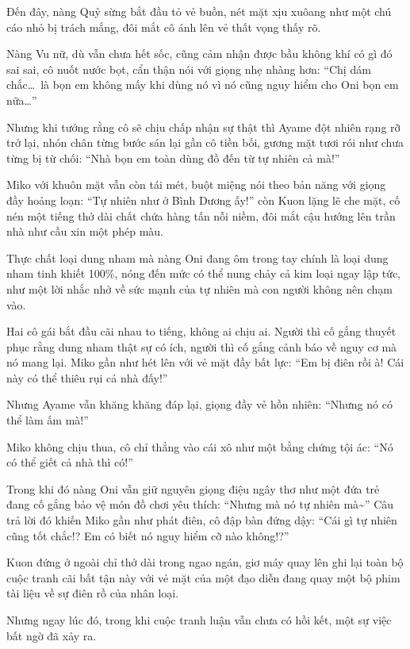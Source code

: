 \documentclass[../main.tex]{subfiles}
\begin{document}
Đến đây, nàng Quỷ sừng bắt đầu tỏ vẻ buồn, nét mặt xịu xuôang như một chú cáo nhỏ bị trách mắng, đôi mắt cô ánh lên vẻ thất vọng thấy rõ.

Nàng Vu nữ, dù vẫn chưa hết sốc, cũng cảm nhận được bầu không khí có gì đó sai sai, cô nuốt nước bọt, cẩn thận nói với giọng nhẹ nhàng hơn: ``Chị dám chắc\dots\ là bọn em không mấy khi dùng nó vì nó cũng nguy hiểm cho Oni bọn em nữa\dots''

Nhưng khi tưởng rằng cô sẽ chịu chấp nhận sự thật thì Ayame đột nhiên rạng rỡ trở lại, nhón chân từng bước sán lại gần cô tiền bối, gương mặt tươi rói như chưa từng bị từ chối: ``Nhà bọn em toàn dùng đồ đến từ tự nhiên cả mà!''

Miko với khuôn mặt vẫn còn tái mét, buột miệng nói theo bản năng với giọng đầy hoảng loạn: ``Tự nhiên như ở Bình Dương ấy!'' còn Kuon lặng lẽ che mặt, cố nén một tiếng thở dài chất chứa hàng tấn nỗi niềm, đôi mắt cậu hướng lên trần nhà như cầu xin một phép màu.

Thực chất loại dung nham mà nàng Oni đang ôm trong tay chính là loại dung nham tinh khiết 100\%, nóng đến mức có thể nung chảy cả kim loại ngay lập tức, như một lời nhắc nhở về sức mạnh của tự nhiên mà con người không nên chạm vào.

Hai cô gái bắt đầu cãi nhau to tiếng, không ai chịu ai. Người thì cố gắng thuyết phục rằng dung nham thật sự có ích, người thì cố gắng cảnh báo về nguy cơ mà nó mang lại. Miko gần như hét lên với vẻ mặt đầy bất lực: ``Em bị điên rồi à! Cái này có thể thiêu rụi cả nhà đấy!''

Nhưng Ayame vẫn khăng khăng đáp lại, giọng đầy vẻ hồn nhiên: ``Nhưng nó có thể làm ấm mà!''

Miko không chịu thua, cô chỉ thẳng vào cái xô như một bằng chứng tội ác: ``Nó có thể giết cả nhà thì có!''

Trong khi đó nàng Oni vẫn giữ nguyên giọng điệu ngây thơ như một đứa trẻ đang cố gắng bảo vệ món đồ chơi yêu thích: ``Nhưng mà nó tự nhiên mà\~{}'' Câu trả lời đó khiến Miko gần như phát điên, cô đập bàn đứng dậy: ``Cái gì tự nhiên cũng tốt chắc!? Em có biết nó nguy hiểm cỡ nào không!?''

Kuon đứng ở ngoài chỉ thở dài trong ngao ngán, giơ máy quay lên ghi lại toàn bộ cuộc tranh cãi bất tận này với vẻ mặt của một đạo diễn đang quay một bộ phim tài liệu về sự điên rồ của nhân loại.

Nhưng ngay lúc đó, trong khi cuộc tranh luận vẫn chưa có hồi kết, một sự việc bất ngờ đã xảy ra.
\end{document}
